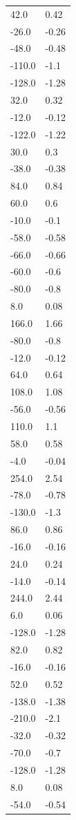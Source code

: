 \begin{longtable}{ll}
42.0 & 0.42 \\
-26.0 & -0.26 \\
-48.0 & -0.48 \\
-110.0 & -1.1 \\
-128.0 & -1.28 \\
32.0 & 0.32 \\
-12.0 & -0.12 \\
-122.0 & -1.22 \\
30.0 & 0.3 \\
-38.0 & -0.38 \\
84.0 & 0.84 \\
60.0 & 0.6 \\
-10.0 & -0.1 \\
-58.0 & -0.58 \\
-66.0 & -0.66 \\
-60.0 & -0.6 \\
-80.0 & -0.8 \\
8.0 & 0.08 \\
166.0 & 1.66 \\
-80.0 & -0.8 \\
-12.0 & -0.12 \\
64.0 & 0.64 \\
108.0 & 1.08 \\
-56.0 & -0.56 \\
110.0 & 1.1 \\
58.0 & 0.58 \\
-4.0 & -0.04 \\
254.0 & 2.54 \\
-78.0 & -0.78 \\
-130.0 & -1.3 \\
86.0 & 0.86 \\
-16.0 & -0.16 \\
24.0 & 0.24 \\
-14.0 & -0.14 \\
244.0 & 2.44 \\
6.0 & 0.06 \\
-128.0 & -1.28 \\
82.0 & 0.82 \\
-16.0 & -0.16 \\
52.0 & 0.52 \\
-138.0 & -1.38 \\
-210.0 & -2.1 \\
-32.0 & -0.32 \\
-70.0 & -0.7 \\
-128.0 & -1.28 \\
8.0 & 0.08 \\
-54.0 & -0.54 \\

\end{longtable}

